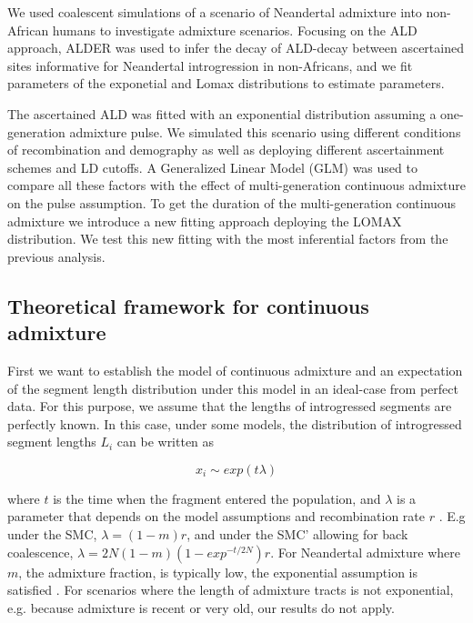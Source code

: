 \documentclass[]{article}
\begin{document}
We used coalescent simulations of a scenario of Neandertal admixture into non-African humans to investigate admixture scenarios. Focusing on the ALD approach, ALDER was used to infer the decay of ALD-decay between ascertained sites informative for Neandertal introgression in non-Africans, and we fit parameters of the exponetial and Lomax distributions to estimate parameters.

The ascertained ALD was fitted with an exponential distribution assuming a one-generation admixture pulse.  We simulated this scenario using different conditions of recombination and demography as well as deploying different ascertainment schemes and LD cutoffs. A Generalized Linear Model (GLM) was used to compare all these factors with the effect of multi-generation continuous admixture on the pulse assumption. To get the duration of the multi-generation continuous admixture we introduce a new fitting approach deploying the LOMAX distribution. We test this new fitting with the most inferential factors from the previous analysis.

\subsection{Theoretical framework for continuous admixture}\label{theoretical framework for continuous admixture}

First we want to establish the model of continuous admixture and an
expectation of the segment length distribution under this model in an
ideal-case from perfect data. For this purpose, we assume that the
lengths of introgressed segments are perfectly known. In this case, under
some models, the distribution of introgressed segment lengths \(L_i\) can
be written as

\begin{equation}
x_i \sim exp({t \lambda})
\end{equation}

where \(t\) is the time when the fragment entered the population, and
\(\lambda\) is a parameter that depends on the model assumptions and
recombination rate \(r\) \citep{liang_lengths_2014}. E.g under the SMC,
\(\lambda = (1-m)r\), and under the SMC' allowing for back coalescence,
\(\lambda = 2N(1-m)(1-exp^{-t/2N})r\). For Neandertal admixture where
\(m\), the admixture fraction, is typically low, the exponential
assumption is satisfied \cite{liang_lengths_2014}. For scenarios where
the length of admixture tracts is not exponential, e.g. because
admixture is recent or very old, our results do not apply.
\end{document}
